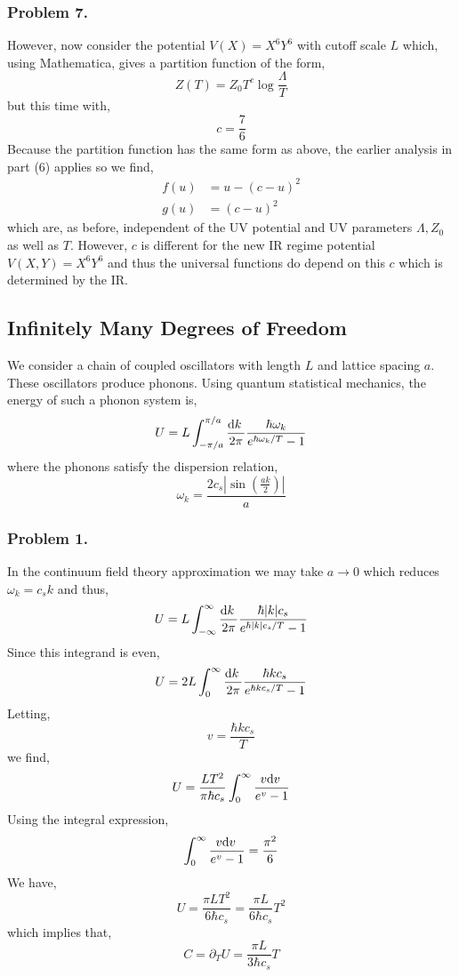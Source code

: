 \documentclass[12pt]{article}
\begin{document}
\subsubsection{Problem 7.}

However, now consider the potential $V(X) = X^6 Y^6$ with cutoff scale $L$ which, using Mathematica, gives a partition function of the form,
\[ Z(T) = Z_0 T^c \log{\frac{\Lambda}{T}} \]
but this time with,
\[ c = \frac{7}{6} \]
Because the partition function has the same form as above, the earlier analysis in part (6) applies so we find,
\begin{align*}
f(u) & = u - (c - u)^2
\\
g(u) & = (c - u)^2
\end{align*}
which are, as before, independent of the UV potential and UV parameters $\Lambda, Z_0$ as well as $T$. However, $c$ is different for the new IR regime potential $V(X, Y) = X^6 Y^6$ and thus the universal functions do depend on this $c$ which is determined by the IR. 

\subsection{Infinitely Many Degrees of Freedom}

We consider a chain of coupled oscillators with length $L$ and lattice spacing $a$. These oscillators produce phonons. Using quantum statistical mechanics, the energy of such a phonon system is,
\[ U = L \int_{- \pi / a}^{\pi / a} \frac{\mathrm{d}k \:}{2 \pi} \frac{\hbar \omega_k}{e^{\hbar \omega_k/T} - 1} \]
where the phonons satisfy the dispersion relation,
\[ \omega_k = \frac{2 c_s |\sin( \frac{a k}{2} )|}{a} \]
 
\subsubsection{Problem 1.}

In the continuum field theory approximation we may take $a \to 0$ which reduces $\omega_k = c_s k$ and thus,
\[ U = L \int_{-\infty}^{\infty} \frac{\mathrm{d}k \:}{2 \pi} \frac{\hbar |k| c_s}{e^{\hbar |k| c_s / T} - 1} \]
Since this integrand is even,
\[ U = 2 L \int_{0}^{\infty} \frac{\mathrm{d}k \:}{2 \pi} \frac{\hbar k c_s}{e^{\hbar k c_s / T} - 1} \]
Letting,
\[ v = \frac{\hbar k c_s}{T} \]
we find,
\[ U = \frac{L T^2}{\pi \hbar c_s} \int_{0}^{\infty} \frac{v \mathrm{d}v \:}{e^v - 1}  \]
Using the integral expression,
\[ \int_{0}^{\infty} \frac{v \mathrm{d}v \:}{e^v - 1} = \frac{\pi^2}{6} \] 
We have,
\[U = \frac{\pi L T^2}{6 \hbar c_s} = \frac{\pi L}{6 \hbar c_s} T^2 \]
which implies that,
\[ C = \partial_T U = \frac{\pi L}{3 \hbar c_s} T \]
\end{document}
